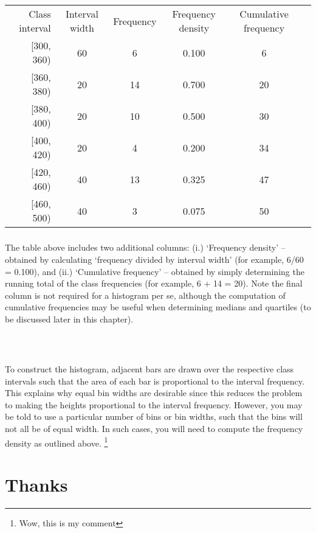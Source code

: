 \documentclass[10pt,a4paper]{report}
\begin{document}
\begin{tabular}{ |r|c|c|c|c|c|}
\multicolumn{1}{r}{Class interval} &  \multicolumn{1}{c}{Interval width} & \multicolumn{1}{c}{Frequency} & \multicolumn{1}{c}{Frequency density} & \multicolumn{1}{c}{Cumulative frequency} \\
\cline{1-6} [300, 360) & 60 & 6 & 0.100 & 6  \\
\cline{1-6} [360, 380) & 20 & 14 & 0.700 & 20  \\
\cline{1-6} [380, 400) & 20 & 10 & 0.500 & 30  \\
\cline{1-6} [400, 420) & 20 & 4 & 0.200 & 34  \\
\cline{1-6} [420, 460) & 40 & 13 & 0.325 & 47  \\
\cline{1-6} [460, 500) & 40 & 3 & 0.075 & 50  \\
\hline
\end{tabular} 

\paragraph{}The table above includes two additional columns: (i.) ‘Frequency density’ – obtained by calculating ‘frequency divided by interval width’ (for example, 6/60 = 0.100), and (ii.) ‘Cumulative frequency’ – obtained by simply determining the running total of the class frequencies (for example, 6 + 14 = 20). Note the final column is not required for a histogram per se, although the computation of cumulative frequencies may be useful when determining medians and quartiles (to be discussed later in this chapter). \cite{Sulsky1994}\\
\\
\\
\paragraph{}To construct the histogram, adjacent bars are drawn over the respective class intervals such that the area of each bar is proportional to the interval frequency. This explains why equal bin widths are desirable since this reduces the problem to making the heights proportional to the interval frequency. However, you may be told to use a particular number of bins or bin widths, such that the bins will not all be of equal width. In such cases, you will need to compute the frequency density as outlined above. \footnote{Wow, this is my comment}
\\

\chapter{Thanks}
\end{document}
